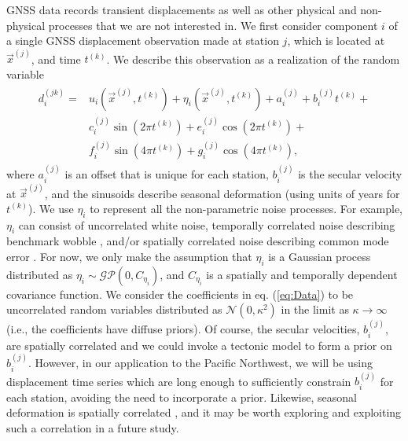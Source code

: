 \documentclass[extra,mreferee]{gji}
\begin{document}
GNSS data records transient displacements as well as other physical and non-physical processes that we are not interested in. We first consider component $i$ of a single GNSS displacement observation made at station $j$, which is located at $\vec{x}^{(j)}$, and time $t^{(k)}$. We describe this observation as a realization of the random variable 
\begin{align}\label{eq:Data}
\begin{split}
d_i^{(jk)} = &u_i\left(\vec{x}^{(j)},t^{(k)}\right) + 
              \eta_i\left(\vec{x}^{(j)},t^{(k)}\right) + 
              a_i^{(j)} + b_i^{(j)}t^{(k)} + \\
             &c_i^{(j)}\sin\left(2 \pi t^{(k)}\right) +  
              e_i^{(j)}\cos\left(2 \pi t^{(k)}\right) + \\ 
             &f_i^{(j)}\sin\left(4 \pi t^{(k)}\right)  + 
              g_i^{(j)}\cos\left(4 \pi t^{(k)}\right), 
\end{split}
\end{align}
where $a_i^{(j)}$ is an offset that is unique for each station, $b_i^{(j)}$ is the secular velocity at $\vec{x}^{(j)}$, and the sinusoids describe seasonal deformation (using units of years for $t^{(k)}$). We use $\eta_i$ to represent all the non-parametric noise processes. For example, $\eta_i$ can consist of uncorrelated white noise, temporally correlated noise describing benchmark wobble \citep[e.g.,][]{Wyatt1982,Wyatt1989}, and/or spatially correlated noise describing common mode error \citep[e.g.,][]{Wdowinski1997}. For now, we only make the assumption that $\eta_i$ is a Gaussian process distributed as $\eta_i \sim \mathcal{GP}(0,C_{\eta_i})$, and $C_{\eta_i}$ is a spatially and temporally dependent covariance function. We consider the coefficients in eq. (\ref{eq:Data}) to be uncorrelated random variables distributed as $\mathcal{N}(0,\kappa^2)$ in the limit as $\kappa \to \infty$ (i.e., the coefficients have diffuse priors). Of course, the secular velocities, $b_i^{(j)}$, are spatially correlated and we could invoke a tectonic model to form a prior on $b_i^{(j)}$. However, in our application to the Pacific Northwest, we will be using displacement time series which are long enough to sufficiently constrain $b_i^{(j)}$ for each station, avoiding the need to incorporate a prior. Likewise, seasonal deformation is spatially correlated \citep{Dong2002,Langbein2008}, and it may be worth exploring and exploiting such a correlation in a future study. 
\end{document}
